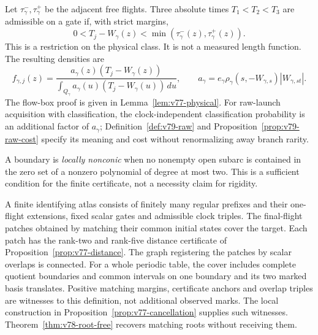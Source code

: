 Let $\tau^-_\gamma,\tau^+_\gamma$ be the adjacent free flights.  Three
absolute times $T_1<T_2<T_3$ are admissible on a gate if, with strict
margins,
\begin{equation}\label{eq:v77-window}
 0<T_j-W_\gamma(z)<\min(\tau^-_\gamma(z),\tau^+_\gamma(z)).
\end{equation}
This is a restriction on the physical class.  It is not a measured
length function.  The resulting densities are
\begin{equation}\label{eq:v78-intro-law}
 f_{\gamma,j}(z)=
 \frac{a_\gamma(z)(T_j-W_\gamma(z))}
 {\int_{Q_\gamma}a_\gamma(u)(T_j-W_\gamma(u))\,du},\qquad
 a_\gamma=e_\gamma\rho_\gamma(s,-W_{\gamma,s})
                   |W_{\gamma,st}|.
\end{equation}
The flow-box proof is given in Lemma~\ref{lem:v77-physical}.
For raw-launch acquisition with classification, the clock-independent
classification probability is an additional factor of $a_\gamma$;
Definition~\ref{def:v79-raw} and Proposition~\ref{prop:v79-raw-cost}
specify its meaning and cost without renormalizing away branch rarity.

A boundary is \emph{locally nonconic} when no nonempty open subarc
is contained in the zero set of a nonzero polynomial of degree at most two.
This is a sufficient condition for the finite certificate, not a
necessity claim for rigidity.

\begin{definition}\label{def:v77-atlas}
A finite identifying atlas consists of finitely many regular prefixes
and their one-flight extensions, fixed scalar gates and admissible clock
triples.  The final-flight patches obtained by matching their common
initial states cover the target.  Each patch has the rank-two and
rank-five distance certificate of Proposition~\ref{prop:v77-distance}.
The graph registering the patches by scalar overlaps is connected.
For a whole periodic table, the cover includes complete quotient
boundaries and common intervals on one boundary and its two marked basis
translates.  Positive matching margins, certificate anchors and overlap
triples are witnesses to this definition, not additional observed marks.
The local construction in Proposition~\ref{prop:v77-cancellation} supplies
such witnesses.  Theorem~\ref{thm:v78-root-free} recovers matching roots
without receiving them.
\end{definition}


